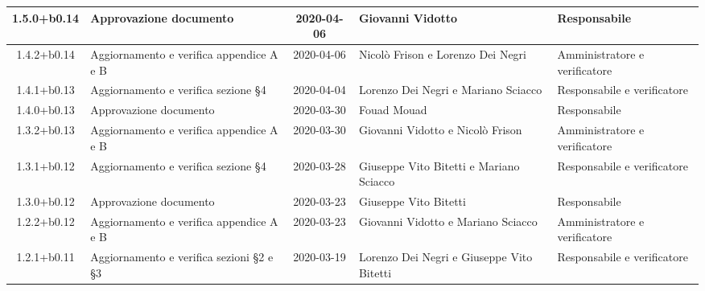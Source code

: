 \begin{center}
\begin{longtable}{|c|p{3.5cm}|c|p{3cm}|p{3cm}|}
	1.5.0+b0.14 & Approvazione documento & 2020-04-06 & Giovanni Vidotto & Responsabile \\
	\hline
	1.4.2+b0.14 & Aggiornamento e verifica appendice A e B & 2020-04-06 & Nicolò Frison e Lorenzo Dei Negri & Amministratore e verificatore \\
	\hline
	1.4.1+b0.13 & Aggiornamento e verifica sezione \S4 & 2020-04-04 & Lorenzo Dei Negri e Mariano Sciacco & Responsabile e verificatore \\
	\hline
	
	1.4.0+b0.13 & Approvazione documento & 2020-03-30 & Fouad Mouad & Responsabile \\
	\hline
	1.3.2+b0.13 & Aggiornamento e verifica appendice A e B & 2020-03-30 & Giovanni Vidotto e Nicolò Frison & Amministratore e verificatore \\
	\hline
	1.3.1+b0.12 & Aggiornamento e verifica sezione \S4 & 2020-03-28 & Giuseppe Vito Bitetti e Mariano Sciacco & Responsabile e verificatore \\
	\hline
	
	1.3.0+b0.12 & Approvazione documento & 2020-03-23 & Giuseppe Vito Bitetti & Responsabile \\
	\hline
	1.2.2+b0.12 & Aggiornamento e verifica appendice A e B & 2020-03-23 & Giovanni Vidotto e Mariano Sciacco & Amministratore e verificatore \\
	\hline
	1.2.1+b0.11 & Aggiornamento e verifica sezioni \S2 e \S3 & 2020-03-19 & Lorenzo Dei Negri e Giuseppe Vito Bitetti & Responsabile e verificatore \\
	\hline
	

\end{longtable}
\end{center}
